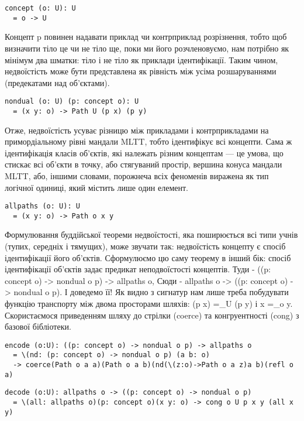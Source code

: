 \begin{lstlisting}
concept (o: U): U
  = o -> U
\end{lstlisting}

Концепт p повинен надавати приклад чи контрприклад розрізнення, тобто щоб
визначити тіло це чи не тіло ще, поки ми його розчленовуємо, нам
потрібно як мінімум два шматки: тіло і не тіло як приклади ідентифікації.
Таким чином, недвоїстість може бути представлена як рівність між усіма
розшаруваннями (предекатами над об'єктами).

\begin{lstlisting}
nondual (o: U) (p: concept o): U
  = (x y: o) -> Path U (p x) (p y)
\end{lstlisting}

Отже, недвоїстість усуває різницю між прикладами і контрприкладами на
примордіальному рівні мандали MLTT, тобто ідентифікує всі концепти.
Сама ж ідентифікація класів об'єктів, які належать різним концептам — це умова,
що стискає всі об'єкти в точку, або стягуваний простір, вершина конуса
мандали MLTT, або, іншими словами, порожнеча всіх феноменів виражена як тип
логічної одиниці, який містить лише один елемент.

\begin{lstlisting}
allpaths (o: U): U
  = (x y: o) -> Path o x y
\end{lstlisting}

Формулювання буддійської теореми недвоїстості, яка поширюється всі
типи учнів (тупих, середніх і тямущих), може звучати так: недвоїстість
концепту є спосіб ідентифікації його об'єктів. Сформулюємо цю саму теорему
в інший бік: спосіб ідентифікації об'єктів задає предикат неподвоїстості концептів.
Туди - ((p: concept o) -> nondual o p) -> allpaths o,
Сюди - allpaths o -> ((p: concept o) -> nondual o p).
І доведемо її! Як видно з сигнатур нам лише треба побудувати функцію
транспорту між двома просторами шляхів: (p x) =_U (p y) і x =_o y.
Скористаємося приведенням шляху до стрілки (coerce) та конгруентності
(cong) з базової бібліотеки.

\begin{lstlisting}
encode (o:U): ((p: concept o) -> nondual o p) -> allpaths o
  = \(nd: (p: concept o) -> nondual o p) (a b: o)
  -> coerce(Path o a a)(Path o a b)(nd(\(z:o)->Path o a z)a b)(refl o a)
\end{lstlisting}

\begin{lstlisting}
decode (o:U): allpaths o -> ((p: concept o) -> nondual o p)
  = \(all: allpaths o)(p: concept o)(x y: o) -> cong o U p x y (all x y)
\end{lstlisting}

